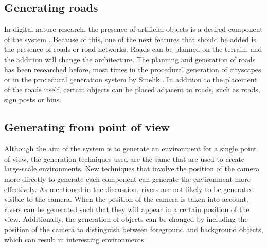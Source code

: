 \subsection{Generating roads}
In digital nature research, the presence of artificial objects is a desired component of the system \cite{van_houwelingen-snippe_designing_2023}. Because of this, one of the next features that should be added is the presence of roads or road networks. Roads can be planned on the terrain, and the addition will change the architecture. The planning and generation of roads has been researched before, most times in the procedural generation of cityscapes \cite{kelly_citygen_nodate} or in the procedural generation system by Smelik \cite{smelik_declarative_2011}. In addition to the placement of the roads itself, certain objects can be placed adjacent to roads, such as roads, sign posts or bins.

\subsection{Generating from point of view}
Although the aim of the system is to generate an environment for a single point of view, the generation techniques used are the same that are used to create large-scale environments. New techniques that involve the position of the camera more directly to generate each component can generate the environment more effectively. As mentioned in the discussion, rivers are not likely to be generated visible to the camera. When the position of the camera is taken into account, rivers can be generated such that they will appear in a certain position of the view. Additionally, the generation of objects can be changed by including the position of the camera to distinguish between foreground and background objects, which can result in interesting environments.
